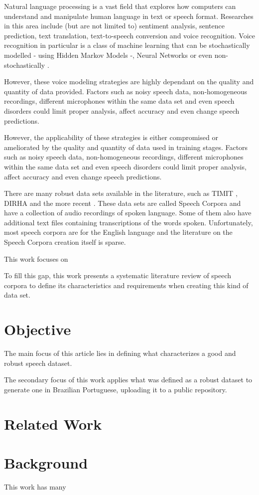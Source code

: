 Natural language processing is a vast field that explores how computers can understand and manipulate human language in text or speech format. Researches in this area include (but are not limited to) sentiment analysis, sentence prediction, text translation, text-to-speech conversion and voice recognition. Voice recognition in particular is a class of machine learning that can be stochastically modelled - using Hidden Markov Models \cite{gales2008application} -, Neural Networks \cite{graves2013speech} or even non-stochastically \cite{burget2003nonrandomattr}.

However, these voice modeling strategies are highly dependant on the quality and quantity of data provided. Factors such as noisy speech data, non-homogeneous recordings, different microphones within the same data set and even speech disorders could limit proper analysis, affect accuracy and even change speech predictions. 

However, the applicability of these strategies is either compromised or ameliorated by the quality and quantity of data used in training stages. Factors such as noisy speech data, non-homogeneous recordings, different microphones within the same data set and even speech disorders could limit proper analysis, affect accuracy and even change speech predictions.

There are many robust data sets available in the literature, such as TIMIT \cite{Lamel1992timmit}, DIRHA \cite{Ravanelli2016dirha} and the more recent \cite{chanchaochai2018globaltimit}. These data sets are called Speech Corpora and have a collection of audio recordings of spoken language. Some of them also have additional text files containing transcriptions of the words spoken. Unfortunately, most speech corpora are for the English language \cite{LeRouxVincent2014TRdatasets} and the literature on the Speech Corpora creation itself is sparse.

This work focuses on 

To fill this gap, this work presents a systematic literature review of speech corpora to define its characteristics and requirements when creating this kind of data set.

\chapter{Objective}

The main focus of this article lies in defining what characterizes a good and robust speech dataset.

The secondary focus of this work applies what was defined as a robust dataset to generate one in Brazilian Portuguese, uploading it to a public repository. 

\chapter{Related Work}



\chapter{Background}

This work has many  